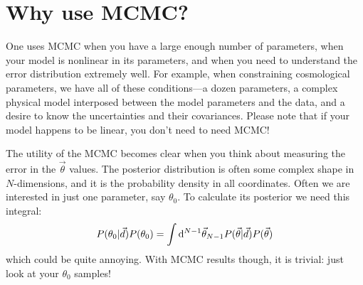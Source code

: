 \section{Why use MCMC?}

One uses MCMC when you have a large enough number of parameters, when
your model is nonlinear in its parameters, and when you need to
understand the error distribution extremely well. For example, when
constraining cosmological parameters, we have all of these
conditions---a dozen parameters, a complex physical model interposed
between the model parameters and the data, and a desire to know the
uncertainties and their covariances. Please note that if your model
happens to be linear, you don't need to need MCMC!

The utility of the MCMC becomes clear when you think about measuring
the error in the $\vec{\theta}$ values. The posterior distribution is
often some complex shape in $N$-dimensions, and it is the probability
density in all coordinates. Often we are interested in just one
parameter, say $\theta_0$. To calculate its posterior we need this
integral:
\begin{equation}
P(\theta_0 | \vec{d}) P(\theta_0) = \int {\rm
d}^{N-1}\vec{\theta}_{N-1} P(\vec{\theta} | \vec{d}) P(\vec{\theta})
\end{equation}
which could be quite annoying. With MCMC results though, it is
trivial: just look at your $\theta_0$ samples!

